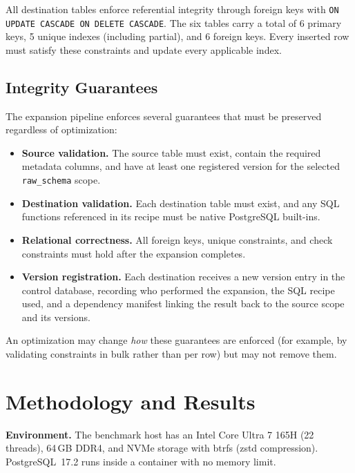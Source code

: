 \documentclass[journal]{IEEEtran}
\begin{document}
All destination tables enforce referential integrity through foreign keys with \texttt{ON UPDATE CASCADE ON DELETE CASCADE}.
The six tables carry a total of 6 primary keys, 5 unique indexes (including partial), and 6 foreign keys.
Every inserted row must satisfy these constraints and update every applicable index.

\subsection{Integrity Guarantees}
\label{sec:guarantees}

The expansion pipeline enforces several guarantees that must be preserved regardless of optimization:

\begin{itemize}
  \item \textbf{Source validation.} The source table must exist, contain the required metadata columns, and have at least one registered version for the selected \texttt{raw\_schema} scope.
  \item \textbf{Destination validation.} Each destination table must exist, and any SQL functions referenced in its recipe must be native PostgreSQL built-ins.
  \item \textbf{Relational correctness.} All foreign keys, unique constraints, and check constraints must hold after the expansion completes.
  \item \textbf{Version registration.} Each destination receives a new version entry in the control database, recording who performed the expansion, the SQL recipe used, and a dependency manifest linking the result back to the source scope and its versions.
\end{itemize}

An optimization may change \emph{how} these guarantees are enforced (for example, by validating constraints in bulk rather than per row) but may not remove them.

\section{Methodology and Results}
\label{sec:methodology}

\textbf{Environment.}
The benchmark host has an Intel Core Ultra 7 165H (22 threads), 64\,GB DDR4, and NVMe storage with btrfs (zstd compression).
PostgreSQL~17.2 runs inside a container with no memory limit.
\end{document}
